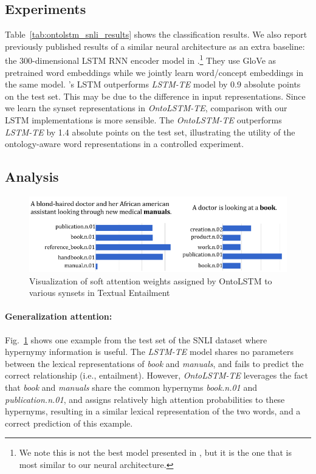 \subsection{Experiments}
Table~\ref{tab:ontolstm_snli_results} shows the classification results. We also 
report previously published results of a similar neural architecture as an extra 
baseline: the 300-dimensional LSTM RNN encoder model in 
\cite{bowman2016fast}.\footnote{We note this is not the best model presented in 
\cite{bowman2016fast}, but it is the one that is most similar to our neural 
architecture.}
They use GloVe as pretrained word embeddings while we jointly learn word/concept 
embeddings in the same model.
\cite{bowman2016fast}'s LSTM outperforms \textit{LSTM-TE} model by 0.9 absolute points 
on the test set. This may be due to the difference in input representations. 
Since we learn the synset representations in \textit{OntoLSTM-TE}, comparison with our LSTM 
implementations is more sensible.
The \textit{OntoLSTM-TE} outperforms \textit{LSTM-TE} by 1.4 absolute 
points on the test set, illustrating the utility of the ontology-aware word 
representations in a controlled experiment.

\subsection{Analysis}
\label{sec:ontolstm_snli_discussion}
\begin{figure}
\begin{center}
\includegraphics[width=5in]{figures/ontolstm_snli_comparison.png}
\caption{Visualization of soft attention weights assigned by OntoLSTM to various synsets in Textual Entailment}
\label{fig:ontolstm_snli_visualization}
\end{center}
\end{figure}

\paragraph{Generalization attention:} \label{sec:ontolstm_snli_generalization}
Fig.~\ref{fig:ontolstm_snli_visualization} shows one example from the test set of the 
SNLI dataset where hypernymy information is useful. 
The \textit{LSTM-TE} model shares no parameters between the lexical representations of 
\textit{book} and \textit{manuals}, and fails to predict the correct 
relationship (i.e., entailment). 
However, \textit{OntoLSTM-TE} leverages the fact that \textit{book} 
and \textit{manuals} share the common hypernyms \textit{book.n.01} and 
\textit{publication.n.01}, and assigns relatively high attention probabilities 
to these hypernyms, resulting in a similar lexical representation of the two 
words, and a correct prediction of this example.

